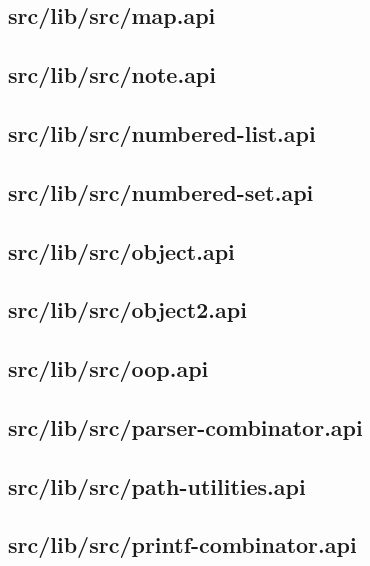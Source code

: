 \subsection{src/lib/src/map.api}


\subsection{src/lib/src/note.api}


\subsection{src/lib/src/numbered-list.api}


\subsection{src/lib/src/numbered-set.api}


\subsection{src/lib/src/object.api}


\subsection{src/lib/src/object2.api}


\subsection{src/lib/src/oop.api}


\subsection{src/lib/src/parser-combinator.api}


\subsection{src/lib/src/path-utilities.api}


\subsection{src/lib/src/printf-combinator.api}


